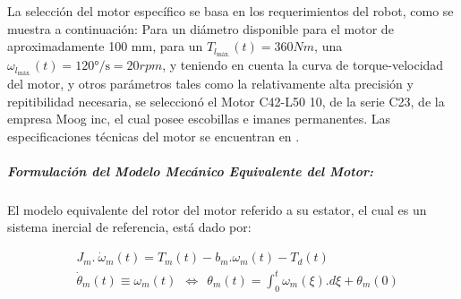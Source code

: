 \documentclass{article}
\begin{document}
\begin{sloppypar}
La selección del motor específico se basa en los requerimientos del robot, como se muestra a continuación:
Para un diámetro disponible para el motor de aproximadamente 100 mm, para un $T_{l_{\text{máx.}}}(t)=360 Nm$, una $\omega_{l_{\text{máx.}}}(t)=120\text{°/s}=20 rpm$, y teniendo en cuenta la curva de torque-velocidad del motor, y otros parámetros tales como la relativamente alta precisión y repitibilidad necesaria, se seleccionó el Motor C42-L50 10, de la serie C23, de la empresa Moog inc, el cual posee escobillas e imanes permanentes. Las especificaciones técnicas del motor se encuentran en \cite{MoogMotorDatasheet}.





\subparagraph{Formulación del Modelo Mecánico Equivalente del Motor:}
\label{sec:Formulación del Modelo Mecánico Equivalente del Motor:}
\hfill

\hfill

El modelo equivalente del rotor del motor referido a su estator, el cual es un sistema inercial de referencia, está dado por:

\begin{subequations} \label{eq:J_m y theta_m}
    \begin{align}
        & \label{eq:J_m}   J_m.\ {\dot{\omega}}_m\left(t\right)=T_m\left(t\right)-b_m.\omega_m(t)-T_d(t)
        \\
        & \label{eq:theta_m}   {\dot{\theta}}_m\left(t\right)\equiv\omega_m\left(t\right)\ \ \Leftrightarrow{\ \ \theta}_m\left(t\right)=\int_{0}^{t}{\omega_m\left(\xi\right).d\xi}+\theta_m\left(0\right)
    \end{align}
\end{subequations}


\end{sloppypar}
\end{document}

